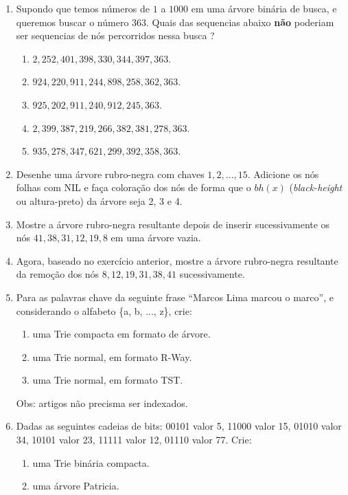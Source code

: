 \begin{enumerate}
\item  Supondo que temos números de $1$ a $1000$ em uma árvore binária de busca,
e queremos buscar o número $363$. Quais das sequencias abaixo {\bf não} 
poderiam ser sequencias de nós percorridos nessa busca ?
	\begin{enumerate}
	\item $2,252,401,398,330,344,397,363$.
	\item $924, 220, 911, 244, 898, 258, 362, 363$.
	\item $925, 202, 911, 240, 912, 245, 363$.
	\item $2,399,387,219,266,382,381,278,363$.
	\item $935, 278, 347, 621, 299, 392, 358, 363$.
	\end{enumerate}

\item Desenhe uma árvore rubro-negra com chaves ${1, 2, ..., 15}$.
Adicione os nós folhas com \textsc{NIL} e faça coloração dos nós de forma
que o $bh(x)$ (\emph{black-height} ou altura-preto) da árvore seja 2, 3 e 4.

\item Mostre a árvore rubro-negra resultante depois de inserir sucessivamente
os nós ${41, 38, 31, 12, 19, 8}$ em uma árvore vazia.

\item Agora, baseado no exercício anterior,  mostre a árvore rubro-negra
resultante da remoção dos nós ${8, 12, 19, 31, 38, 41}$ sucessivamente.

\item Para as palavras chave da seguinte frase ``Marcos Lima marcou o marco'', e
	considerando o alfabeto \{a, b, ..., z\}, crie:
	\begin{enumerate}
	\item uma Trie compacta em formato de árvore.
	\item uma Trie normal, em formato R-Way.
	\item uma Trie normal, em formato TST.
	\end{enumerate}
Obs: artigos não precisma ser indexados.

\item Dadas as seguintes cadeias de bits: 00101 valor 5, 11000 valor 15, 01010 valor 34,
10101 valor 23, 11111 valor 12, 01110 valor 77. Crie:
	\begin{enumerate}
	\item uma Trie binária compacta.
	\item uma árvore Patricia.
	\end{enumerate}

\end{enumerate}

